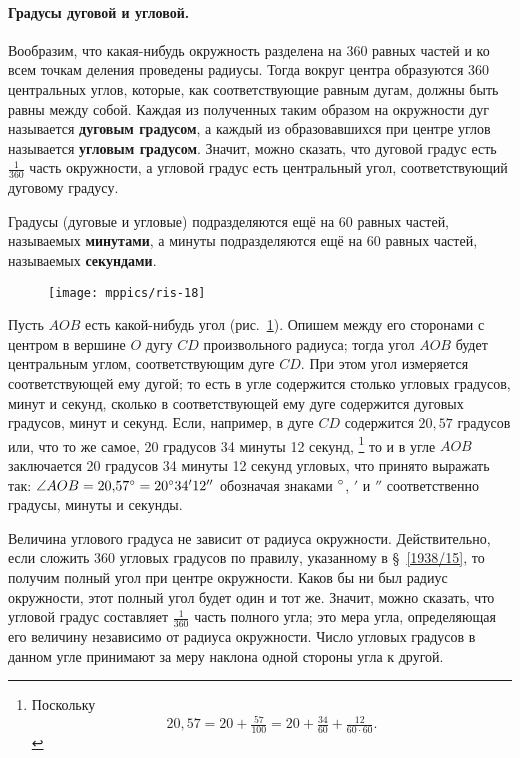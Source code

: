 \paragraph{Градусы дуговой и угловой.}\label{1938/18}
Вообразим, что какая-нибудь окружность разделена на 360 равных частей и ко всем точкам деления проведены радиусы.
Тогда вокруг центра образуются 360 центральных углов, которые, как соответствующие равным дугам, должны быть равны между собой.
Каждая из полученных таким образом на окружности дуг называется \textbf{дуговым градусом}, а каждый из образовавшихся при центре углов называется \textbf{угловым градусом}.
Значит, можно сказать, что дуговой градус есть $\tfrac1{360}$ часть окружности,
а угловой градус есть центральный угол, соответствующий дуговому градусу.

Градусы (дуговые и угловые) подразделяются ещё на 60 равных частей, называемых \textbf{минутами}, а минуты подразделяются ещё на 60 равных частей, называемых \textbf{секундами}.

\begin{figure}[!ht]
\centering
\texttt{[image: mppics/ris-18]}
\caption{}\label{1938/ris-18}
\end{figure}

Пусть $AOB$ есть какой-нибудь угол (рис.~\ref{1938/ris-18}).
Опишем между его сторонами с центром в вершине $O$ дугу $CD$ произвольного радиуса;
тогда угол $AOB$ будет центральным углом, соответствующим дуге $CD$.
При этом угол измеряется соответствующей ему дугой; то есть в угле содержится столько угловых градусов, минут и секунд, сколько в соответствующей ему дуге содержится дуговых градусов, минут и секунд.
Если, например, в дуге $CD$ содержится $20{,}57$ градусов или, что то же самое, 20 градусов 34 минуты 12 секунд,%
\footnote{Поскольку \[20{,}57=20+\tfrac{57}{100}=20+\tfrac{34}{60}+\tfrac{12}{60\cdot 60}.\]}
 то и в угле $AOB$ заключается 20 градусов 34 минуты 12 секунд угловых, что принято выражать так:
$\angle AOB = 20{,}57\degree = 20\degree 34'12''$ обозначая знаками $\degree$, $'$ и $''$ соответственно градусы, минуты и секунды.

Величина углового градуса не зависит от радиуса окружности.
Действительно, если сложить 360 угловых градусов по правилу, указанному в §~\ref{1938/15}, то получим полный угол при центре окружности.
Каков бы ни был радиус окружности, этот полный угол будет один и тот же.
Значит, можно сказать, что угловой градус составляет $\tfrac1{360}$ часть полного угла;
это мера угла, определяющая его величину независимо от радиуса окружности.
Число угловых градусов в данном угле принимают за меру наклона одной стороны угла к другой.

